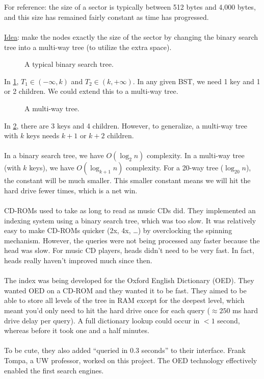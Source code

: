 \documentclass[]{article}
\theoremstyle{definition}
\begin{document}
			\\ \\
			For reference: the size of a sector is typically between 512 bytes and 4,000 bytes, and this size has remained fairly constant as time has progressed.
			\\ \\
			\underline{Idea}: make the nodes exactly the size of the sector by changing the binary search tree into a multi-way tree (to utilize the extra space).
			\begin{figure}[H]
				\caption{A typical binary search tree. \label{figure:typicalbst}}
			\end{figure}

			In \ref{figure:typicalbst}, $T_1 \in (- \infty, k)$ and $T_2 \in (k, +\infty)$. In any given BST, we need 1 key and 1 or 2 children. We could extend this to a multi-way tree.
			\begin{figure}[H]
				\caption{A multi-way tree. \label{figure:typicalmultiwaytree}}
			\end{figure}

			In \ref{figure:typicalmultiwaytree}, there are 3 keys and 4 children. However, to generalize, a multi-way tree with $k$ keys needs $k + 1$ or $k + 2$ children.
			\\ \\
			In a binary search tree, we have $O(\log_2 n)$ complexity. In a multi-way tree (with $k$ keys), we have $O(\log_{k + 1} n)$ complexity. For a 20-way tree ($\log_{20} n$), the constant will be much smaller. This smaller constant means we will hit the hard drive fewer times, which is a net win.
			\\ \\
			CD-ROMs used to take as long to read as music CDs did. They implemented an indexing system using a binary search tree, which was too slow. It was relatively easy to make CD-ROMs quicker (2x, 4x, \ldots) by overclocking the spinning mechanism. However, the queries were not being processed any faster because the head was slow. For music CD players, heads didn't need to be very fast. In fact, heads really haven't improved much since then.
			\\ \\
			The index was being developed for the Oxford English Dictionary (OED). They wanted OED on a CD-ROM and they wanted it to be fast. They aimed to be able to store all levels of the tree in RAM except for the deepest level, which meant you'd only need to hit the hard drive once for each query ($\approx 250$ ms hard drive delay per query). A full dictionary lookup could occur in $< 1$ second, whereas before it took one and a half minutes.
			\\ \\
			To be cute, they also added ``queried in 0.3 seconds'' to their interface. Frank Tompa, a UW professor, worked on this project. The OED technology effectively enabled the first search engines.
\end{document}
